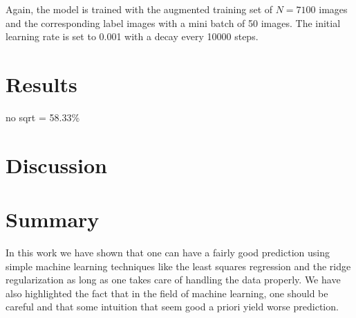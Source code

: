 \documentclass[10pt,conference,compsocconf]{IEEEtran}
\begin{document}
Again, the model is trained with the augmented training set of $N=7100$ images and the corresponding label images with a mini batch of 50 images. The initial learning rate is set to 0.001 with a decay every 10000 steps.

\section{Results}
no sqrt = 58.33\%



\section{Discussion}


\section{Summary}
In this work we have shown that one can have a fairly good prediction using simple machine learning techniques like the least squares regression and the ridge regularization as long as one takes care of handling the data properly. We have also highlighted the fact that in the field of machine learning, one should be careful and that some intuition that seem good a priori yield worse prediction.%

\end{document}
